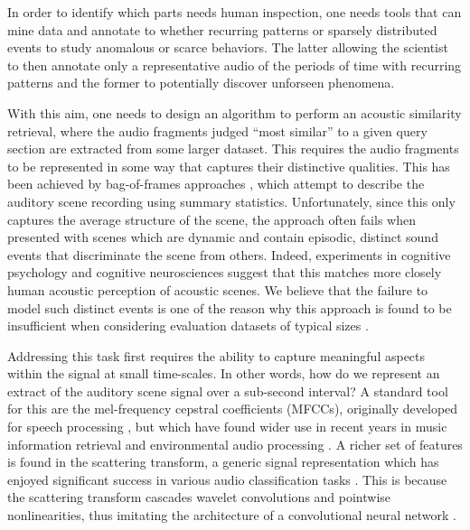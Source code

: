 \documentclass[smallextended]{svjour3}
\begin{document}
In order to identify which parts needs human inspection, one needs tools that can mine data and annotate to whether recurring patterns  or sparsely distributed events to study anomalous or scarce behaviors. The latter allowing the scientist to then annotate only a representative audio of the periods of time with recurring patterns and the former to potentially discover unforseen phenomena.

With this aim, one needs to design an algorithm to perform an acoustic similarity retrieval, where the audio fragments judged ``most similar'' to a given query section are extracted from some larger dataset. This requires the audio fragments to be represented in some way that captures their distinctive qualities. This has been achieved by bag-of-frames approaches \cite{aucouturier2007bag}, which attempt to describe the auditory scene recording using summary statistics. Unfortunately, since this only captures the average structure of the scene, the approach often fails when presented with scenes which are dynamic and contain episodic, distinct sound events that discriminate the scene from others. Indeed, experiments in cognitive psychology \cite{dubois2006cognitive} and cognitive neurosciences \cite{nelken2004processing} suggest that this matches more closely human acoustic perception of acoustic scenes. We believe that the failure to model such distinct events is one of the reason why this approach is found to be insufficient when considering evaluation datasets of typical sizes \cite{lagrange:hal-01082501}.


Addressing this task first requires the ability to capture meaningful aspects within the signal at small time-scales.
In other words, how do we represent an extract of the auditory scene signal over a sub-second interval?
A standard tool for this are the mel-frequency cepstral coefficients (MFCCs), originally developed for speech processing \cite{davis-mermelstein}, but which have found wider use in recent years in music information retrieval \cite{logan} and environmental audio processing \cite{aucouturier2007bag}.
A richer set of features is found in the scattering transform, a generic signal representation which has enjoyed significant success in various audio classification tasks \cite{Anden2014,chudacek}.
This is because the scattering transform cascades wavelet convolutions and pointwise nonlinearities, thus imitating the architecture of a convolutional neural network \cite{lee,lostanlen-deep-spiral,soundnet,arandjelovic-zisserman}.
\end{document}
